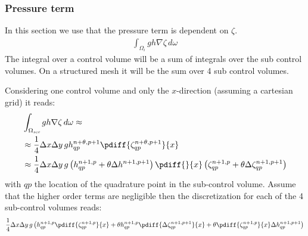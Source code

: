 \subsubsection{Pressure term} \label{sec:linearized_pressure_zeta}
In this section we use that the pressure term is dependent on $\zeta$.
\begin{align}
    \int_{\Omega_i} gh \nabla \zeta \, d\omega
\end{align}
The integral over a control volume will be a sum of integrals over the sub control volumes.
On a structured mesh it will be the sum over 4 sub control volumes.

Considering one control volume and only the $x$-direction (assuming a cartesian grid) it reads:
\begin{align}
    & \int_{\Omega_{\textit{scv}}} gh \nabla \zeta \, d\omega  \approx
    \\
    & \approx \quart \Dx\Dy\, g h^{n+\theta,p+1}_{qp} \pdiff{\zeta^{n+\theta,p+1}_{qp}}{x}
    \\
   & \approx \quart  \Dx\Dy\, g \left( h^{n+1,p}_{qp} + \theta \Delta h^{n+1,p+1}\right)  \pdiff{}{x}\left(\zeta^{n+1,p}_{qp} + \theta \Delta \zeta^{n+1,p+1}_{qp}\right)
\end{align}
with $qp$ the location of the quadrature point in the sub-control volume.
Assume that the higher order terms are negligible then the discretization for each of the 4 sub-control volumes reads:
\begin{align}
        \quart  \Dx\Dy\, g \left(
        h^{n+1,p}_{qp} \pdiff{\zeta^{n+1, p}_{qp}}{x}
        + \theta h^{n+1, p}_{qp} \pdiff{\Delta \zeta^{n+1, p+1}_{qp}}{x}
        + \theta \pdiff{\zeta^{n+1, p}_{qp}}{x} \Delta h^{n+1,p+1}_{qp}
          \right)
\end{align}


